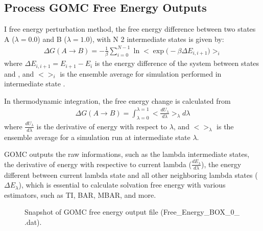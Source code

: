 \documentclass[letterpaper,10pt,english]{sphinxmanual}
\begin{document}
\subsection{Process GOMC Free Energy Outputs}
\label{\detokenize{howto:process-gomc-free-energy-outputs}}
\sphinxAtStartPar
I free energy perturbation method, the free energy difference between two states A
(\(\lambda = 0.0\)) and B (\(\lambda = 1.0\)), with N \sphinxhyphen{} 2 intermediate states is given by:
\begin{equation*}
\begin{split}\Delta G(A \rightarrow B) = -\frac{1}{\beta} \sum_{i=0}^{N-1} \ln \big< \exp \big(- \beta \Delta E_{i, i+1} \big) \big>_i\end{split}
\end{equation*}
\sphinxAtStartPar
where \(\Delta E_{i, i+1} = E_{i+1} - E_{i}\) is the energy difference of the system between states  and ,
and \(\big< \big>_i\) is the ensemble average for simulation performed in intermediate state .

\sphinxAtStartPar
In thermodynamic integration, the free energy change is calculated from
\begin{equation*}
\begin{split}\Delta G(A \rightarrow B) = \int_{\lambda = 0}^{\lambda = 1} \big< \frac{dU_{\lambda}}{d\lambda} \big>_{\lambda} d\lambda\end{split}
\end{equation*}
\sphinxAtStartPar
where \(\frac{dU_{\lambda}}{d\lambda}\) is the derivative of energy with respect
to \(\lambda\), and \(\big< \big>_{\lambda}\) is the ensemble average for a
simulation run at intermediate state \(\lambda\).

\sphinxAtStartPar
GOMC outputs the raw informations, such as the lambda intermediate states,
the derivative of energy with respective to current lambda (\(\frac{dE_{\lambda}}{d\lambda}\)),
the energy different between current lambda state and all other neighboring lambda states
(\(\Delta E_{\lambda}\)), which is essential to calculate solvation free energy
with various estimators, such as TI, BAR, MBAR, and more.

\begin{figure}[htbp]
\centering
\capstart

\noindent{}
\caption{Snapshot of GOMC free energy output file (Free\_Energy\_BOX\_0\_ .dat).}\label{\detokenize{howto:id1}}\end{figure}
\end{document}
